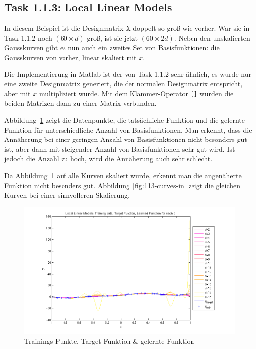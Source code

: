 \subsection{Task 1.1.3: Local Linear Models}

In diesem Beispiel ist die Designmatrix X doppelt so groß wie vorher. War sie in Task 1.1.2 noch $(60 \times d)$ groß, ist sie jetzt $(60 \times 2d)$. Neben den unskalierten Gausskurven gibt es nun auch ein zweites Set von Basisfunktionen: die Gausskurven von vorher, linear skaliert mit $x$.

Die Implementierung in Matlab ist der von Task 1.1.2 sehr ähnlich, es wurde nur eine zweite Designmatrix generiert, die der normalen Designmatrix entspricht, aber mit $x$ multipliziert wurde. Mit dem Klammer-Operator \texttt{[]} wurden die beiden Matrizen dann zu einer Matrix verbunden.

Abbildung~\ref{fig:113-curves-out} zeigt die Datenpunkte, die tatsächliche Funktion und die gelernte Funktion für unterschiedliche Anzahl von Basisfunktionen. Man erkennt, dass die Annäherung bei einer geringen Anzahl von Basisfunktionen nicht besonders gut ist, aber dann mit steigender Anzahl von Basisfunktionen sehr gut wird. Ist jedoch die Anzahl zu hoch, wird die Annäherung auch sehr schlecht.

Da Abbildung~\ref{fig:113-curves-out} auf alle Kurven skaliert wurde, erkennt man die angenäherte Funktion nicht besonders gut. Abbildung~\ref{fig:113-curves-in} zeigt die gleichen Kurven bei einer sinnvolleren Skalierung.

\begin{figure}[h!]
  \centering
  \includegraphics[width=\textwidth]{./figures/1_1_3_curves_out.png}
  \caption{Trainings-Punkte, Target-Funktion \& gelernte Funktion}
  \label{fig:113-curves-out}
\end{figure}


